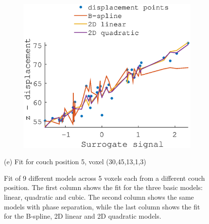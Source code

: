 \documentclass[11pt,a4paper,oneside]{report}
\begin{document}
\begin{figure}[H]
\begin{subfigure}[b]{0.33\textwidth}
  \end{subfigure}
    ~ %
  \begin{subfigure}[b]{0.33\textwidth}
    \includegraphics[width=\textwidth, trim=0 0 0 110,clip=true]{figures/task2/fit_round3_couch5.eps}
  \end{subfigure}
  (e) Fit for couch position 5, voxel (30,45,13,1,3)
  \vspace*{1em}

  
  \caption{Fit of 9 different models across 5 voxels each from a different couch position. The first column shows the fit for the three basic models: linear, quadratic and cubic. The second column shows the same models with phase separation, while the last column shows the fit for the B-spline, 2D linear and 2D quadratic models.}
  \label{fig:c2fit}
  
\end{figure}
\end{document}
